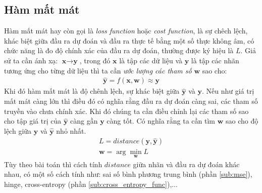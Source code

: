 \subsection{Hàm mất mát}
  Hàm mất mát hay còn gọi là \textit{loss function} hoặc \textit{cost function}, là sự chêch lệch, khác biệt giữa đầu ra dự đoán và đầu ra thực tế bằng một số thực không âm, có chức năng là đo độ chính xác của đầu ra dự đoán, thường được ký hiệu là $L$. Giả sử ta cần ánh xạ: $\textbf{x}\to \textbf{y}$,  trong đó $\textbf{x}$ là tập các dữ liệu và $\textbf{y}$ là tập các nhãn tương ứng cho từng dữ liệu thì ta cần \textit{ước lượng các tham số} $\textbf{w}$ sao cho: 
\begin{align*}
\widehat{\textbf{y}}= f(\textbf{x},\textbf{w}) \approx \textbf{y}
\end{align*}
Khi đó hàm mất mát là độ chênh lệch, sự khác biệt giữa \textbf{$\widehat{\textbf{y}}$} và $\textbf{y}$. Nếu như giá trị mất mát càng lớn thì điều đó có nghĩa rằng đầu ra dự đoán càng sai, các tham số truyền vào chưa chính xác. Khi đó chúng ta cần điều chỉnh lại các tham số sao cho tập giá trị của \textbf{$\widehat{\textbf{y}}$} càng gần $\textbf{y}$ càng tốt. Có nghĩa rằng ta cần tìm $\textbf{w}$ sao cho độ lệch giữa $\textbf{y}$ và $\widehat{\textbf{y}}$ nhỏ nhất.
\begin{align*}
L = distance(\textbf{y},\widehat{\textbf{y}}) \\
\textbf{w} = \arg\min_{\textbf{w}} L
\end{align*}
\hspace{5mm} Tùy theo bài toán thì cách tính $\textit{distance}$ giữa nhãn và đầu ra dự đoán khác nhau, có một số cách tính như: sai số bình phương trung bình (phần \ref{sub:mse}), hinge, cross-entropy (phần \ref{sub:cross_entropy_func}),...
 

